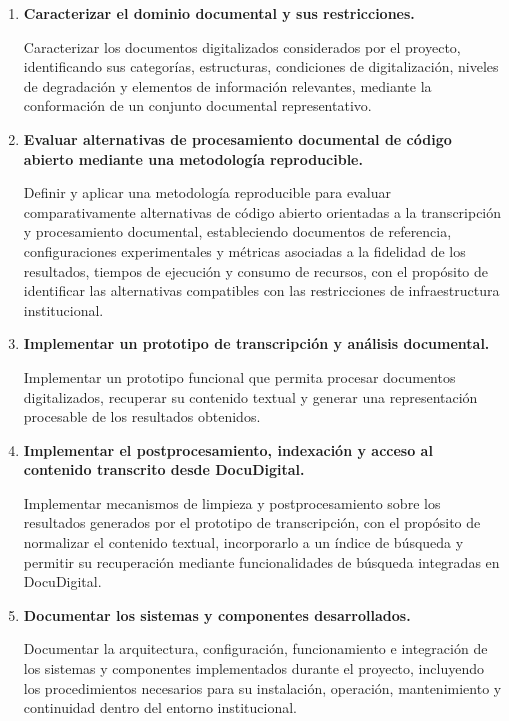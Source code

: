 \begin{enumerate}
    \item[\textbf{OE-01}] \textbf{Caracterizar el dominio documental y sus restricciones.}

    Caracterizar los documentos digitalizados considerados por el proyecto, identificando sus categorías, estructuras, condiciones de digitalización, niveles de degradación y elementos de información relevantes, mediante la conformación de un conjunto documental representativo.

    \item[\textbf{OE-02}] \textbf{Evaluar alternativas de procesamiento documental de código abierto mediante una metodología reproducible.}

    Definir y aplicar una metodología reproducible para evaluar comparativamente alternativas de código abierto orientadas a la transcripción y procesamiento documental, estableciendo documentos de referencia, configuraciones experimentales y métricas asociadas a la fidelidad de los resultados, tiempos de ejecución y consumo de recursos, con el propósito de identificar las alternativas compatibles con las restricciones de infraestructura institucional.

    \item[\textbf{OE-03}] \textbf{Implementar un prototipo de transcripción y análisis documental.}

    Implementar un prototipo funcional que permita procesar documentos digitalizados, recuperar su contenido textual y generar una representación procesable de los resultados obtenidos.

    \item[\textbf{OE-04}] \textbf{Implementar el postprocesamiento, indexación y acceso al contenido transcrito desde DocuDigital.}

    Implementar mecanismos de limpieza y postprocesamiento sobre los resultados generados por el prototipo de transcripción, con el propósito de normalizar el contenido textual, incorporarlo a un índice de búsqueda y permitir su recuperación mediante funcionalidades de búsqueda integradas en DocuDigital.

    \item[\textbf{OE-05}] \textbf{Documentar los sistemas y componentes desarrollados.}

    Documentar la arquitectura, configuración, funcionamiento e integración de los sistemas y componentes implementados durante el proyecto, incluyendo los procedimientos necesarios para su instalación, operación, mantenimiento y continuidad dentro del entorno institucional.
\end{enumerate}


